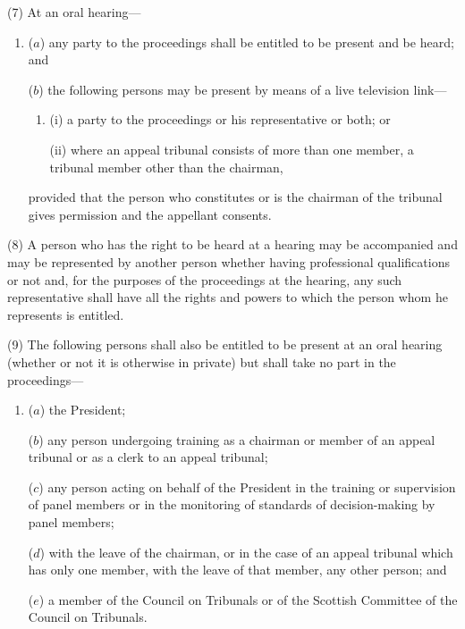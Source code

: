 \documentclass[12pt,a4paper]{article}
\begin{document}
(7) At an oral hearing—
\begin{enumerate}\item[]
($a$) any party to the proceedings shall be entitled to be present and be heard; and

($b$) the following persons may be present by means of a live television link—
\begin{enumerate}\item[]
(i) a party to the proceedings or his representative or both; or

(ii) where an appeal tribunal consists of more than one member, a tribunal member other than the chairman,
\end{enumerate}
provided that the person who constitutes or is the chairman of the tribunal gives permission and the appellant consents.
\end{enumerate}

(8) A person who has the right to be heard at a hearing may be accompanied and may be represented by another person whether having professional qualifications or not and, for the purposes of the proceedings at the hearing, any such representative shall have all the rights and powers to which the person whom he represents is entitled.

(9) The following persons shall also be entitled to be present at an oral hearing (whether or not it is otherwise in private) but shall take no part in the proceedings—
\begin{enumerate}\item[]
($a$) the President;

($b$) any person undergoing training as a chairman or 
member of an appeal tribunal or as a clerk to an appeal tribunal;

($c$) any person acting on behalf of the President in the training or supervision of panel members or in the monitoring of standards of decision-making by panel members;

($d$) with the leave of the chairman, or in the case of an appeal tribunal which has only one member, with the leave of that member, 
any other person; and

($e$) a member of the Council on Tribunals or of the Scottish Committee of the Council on Tribunals.
\end{enumerate}
\end{document}

